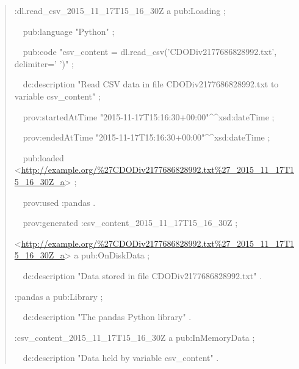 \begin{quotation}
	\noindent:dl.read\_csv\_2015\_11\_17T15\_16\_30Z a pub:Loading ;
	
	\noindent \ \ pub:language "Python" ;
	
	\noindent \ \ pub:code "csv\_content = dl.read\_csv('CDODiv2177686828992.txt', delimiter=' ')" ;
	
	\noindent \ \ dc:description "Read CSV data in file CDODiv2177686828992.txt to variable csv\_content" ;
	
	\noindent \ \ prov:startedAtTime "2015-11-17T15:16:30+00:00"\^{}\^{}xsd:dateTime ;
	
	\noindent \ \ prov:endedAtTime "2015-11-17T15:16:30+00:00"\^{}\^{}xsd:dateTime ;
	
	\noindent \ \ pub:loaded <\url{http://example.org/%27CDODiv2177686828992.txt%27_2015_11_17T15_16_30Z_a}> ;
	
	\noindent \ \ prov:used :pandas .
	
	\noindent \ \ prov:generated :csv\_content\_2015\_11\_17T15\_16\_30Z ;
	
	\noindent<\url{http://example.org/%27CDODiv2177686828992.txt%27_2015_11_17T15_16_30Z_a}> a pub:OnDiskData ;
	
	\noindent \ \ dc:description "Data stored in file CDODiv2177686828992.txt" .
	
	\noindent:pandas a pub:Library ;
	
	\noindent \ \ dc:description "The pandas Python library" .

	\noindent:csv\_content\_2015\_11\_17T15\_16\_30Z a pub:InMemoryData ;
	
	\noindent \ \ dc:description "Data held by variable csv\_content" .	
\end{quotation}

